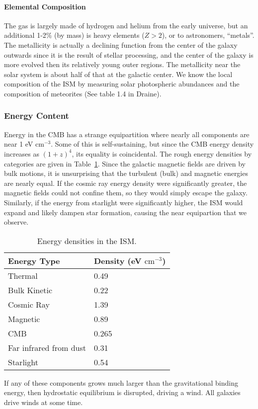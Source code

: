\documentclass[10pt]{article}
\numberwithin{equation}{section}
\begin{document}
\paragraph{Elemental Composition} %
\label{par:elemental_composition}
The gas is largely made of hydrogen and helium from the early universe, but an
additional 1-2\% (by mass) is heavy elements ($Z>2$), or to astronomers,
``metals''. The metallicity is actually a declining function from the center of
the galaxy outwards since it is the result of stellar processing, and the
center of the galaxy is more evolved then its relatively young outer regions.
The metallicity near the solar system is about half of that at the galactic
center. We know the local composition of the ISM by measuring solar
photospheric abundances and the composition of meteorites (See table 1.4 in
Draine).

\subsubsection{Energy Content} %
\label{ssub:energy_content}
Energy in the CMB has a strange equipartition where nearly all components are
near 1 eV cm$^{-3}$. Some of this is self-sustaining, but since the CMB energy
density increases as $(1+z)^4$, its equality is coincidental. The rough energy
densities by categories are given in Table~\ref{tab:1.1}. Since the galactic
magnetic fields are driven by bulk motions, it is unsurprising that the
turbulent (bulk) and magnetic energies are nearly equal. If the cosmic ray
energy density were significantly greater, the magnetic fields could not
confine them, so they would simply escape the galaxy. Similarly, if the energy
from starlight were significantly higher, the ISM would expand and likely
dampen star formation, causing the near equipartion that we observe.
\begin{table}
  \centering
  \begin{tabular}{l l}
    Energy Type & Density (eV $\mathrm{cm^{-3}}$)\\
    \hline
    Thermal & 0.49\\
    Bulk Kinetic & 0.22\\
    Cosmic Ray & 1.39\\
    Magnetic & 0.89\\
    CMB & 0.265\\
    Far infrared from dust & 0.31 \\
    Starlight & 0.54
  \end{tabular}
  \caption{Energy densities in the ISM.}
  \label{tab:1.1}
\end{table}
If any of these components grows much larger than the gravitational binding
energy, then hydrostatic equilibrium is disrupted, driving a wind. All galaxies
drive winds at some time.
\end{document}
